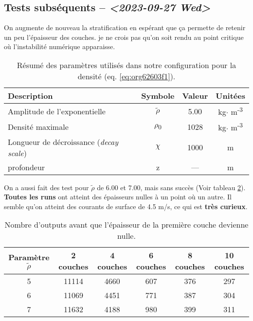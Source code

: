 \documentclass[10pt]{report}
\numberwithin{equation}{section}
\begin{document}
\subsection{Tests subséquents -- \textit{<2023-09-27 Wed>}}
\label{sec:orga17ea7f}

On augmente de nouveau la stratification en espérant que ça permette de retenir un peu l'épaisseur des couches.
je ne crois pas qu'on soit rendu au point critique où l'instabilité numérique apparaisse. 
\begin{table}[htbp]
\caption{\label{tab:org28ec2e3}Résumé des paramètres utilisés dans notre configuration pour la densité (eq. \ref{eq:org62603f1}).}
\centering
\begin{tabular}{lccc}
\hline
\hline
Description & Symbole & Valeur & Unitées\\[0pt]
\hline
Amplitude de l'exponentielle & \(\tilde{\rho}\) & 5.00 & kg\(\cdot\) m\textsuperscript{-3}\\[0pt]
Densité maximale & \(\rho\)\textsubscript{0} & 1028 & kg\(\cdot\) m\textsuperscript{-3}\\[0pt]
Longueur de décroissance (\emph{decay scale}) & \(\chi\) & 1000 & m\\[0pt]
profondeur & z & --- & m\\[0pt]
\hline
\end{tabular}
\end{table}

On a aussi fait des test pour \(\tilde{\rho}\) de 6.00 et 7.00, mais sans succès (Voir tableau \ref{tab:org41df7e9}).
\textbf{Toutes les runs} ont atteint des épaisseurs nulles à un point où un autre.
Il semble qu'on atteint des courants de surface de 4.5 m/s, ce qui est \textbf{très curieux}.

\begin{table}[htbp]
\caption{\label{tab:org41df7e9}Nombre d'outputs avant que l'épaisseur de la première couche devienne nulle.}
\centering
\begin{tabular}{cccccc}
\hline
\hline
Paramètre \(\tilde{\rho}\) & 2 couches & 4 couches & 6 couches & 8 couches & 10 couches\\[0pt]
\hline
5 & 11114 & 4660 & 607 & 376 & 297\\[0pt]
6 & 11069 & 4451 & 771 & 387 & 304\\[0pt]
7 & 11632 & 4188 & 980 & 399 & 311\\[0pt]
\hline
\end{tabular}
\end{table}
\end{document}
